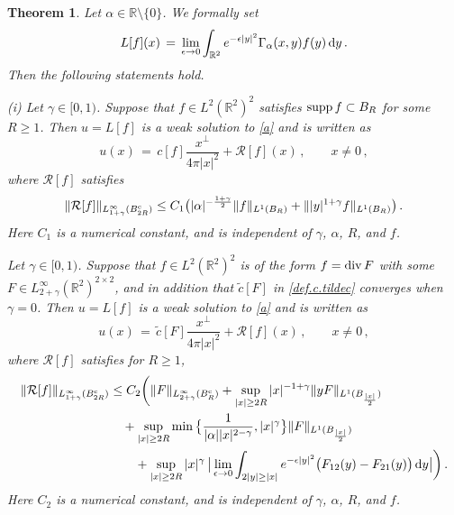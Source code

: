 \documentclass[11pt,a4paper]{article}
\newtheorem{theorem}{Theorem }[section]
\newcommand{\R}{\mathbb{R}}
\newcommand{\dd}{\,{\rm d}}
\begin{document}
\begin{theorem}\label{thm.linear.whole}
Let $\alpha \in \R \setminus \{0\}$. We formally set
%
\begin{equation}
L [f] (x) \, = \, \lim_{\epsilon\rightarrow 0} \int_{\R^2} e^{-\epsilon |y|^2}\Gamma_{\alpha}(x,y) f(y) \dd y\,.
\end{equation}
%
Then the following statements hold.

\noindent 
{\rm (i)} Let $\gamma \in [0,1)$. 
Suppose that $f\in L^2 (\R^2)^2$ satisfies ${\rm supp}\, f \subset B_{R}$ for some $R\ge1$. 
Then $u=L [f]$ is a weak solution to \eqref{a} and is written as 
%
\begin{equation}\label{est.thm.linear.whole.1}
u(x) \, =\,  c[f] \frac{x^{\bot}}{4\pi |x|^2} + \mathcal{R}[f] (x) \,, \qquad x\ne 0\,,
\end{equation}
%
where $\mathcal{R}[f]$ satisfies 
%
\begin{equation}\label{est.thm.linear.whole.2}
\begin{split}
\| \mathcal{R}[f] \|_{L^{\infty}_{1+\gamma} (B^{{\rm c}}_{2R})}
\le 
C_1 \big( 
|\alpha|^{-\frac{1+\gamma}{2}} \| f \|_{L^1 (B_{R})} 
+ \| |y|^{1+\gamma} f\|_{L^{1}(B_{R})} \big)\,.
\end{split}
\end{equation}
%
Here $C_1$ is a numerical constant, and is independent of  $\gamma$, $\alpha$, $R$, and $f$.

 Let $\gamma\in [0,1)$. 
Suppose that $f\in L^2 (\R^2)^2$ is of the form $f={\rm div}\,F$ 
with some $F\in L^\infty_{2+\gamma} (\R^2)^{2\times 2}$, and in addition that $\tilde c[F]$ in \eqref{def.c.tildec} converges when $\gamma=0$. Then $u=L [f]$ is a weak solution to \eqref{a} and is written as
%
\begin{equation}\label{est.thm.linear.whole.3}
u(x) \, = \, \tilde c[F] \frac{x^{\bot}}{4\pi |x|^2}  + \mathcal{R}[f] (x) \,, \quad \quad x\ne 0\,,
\end{equation}
\noindent
where  $\mathcal{R}[f]$ satisfies for $R\ge1$,
%
\begin{equation}\label{est.thm.linear.whole.4}
\begin{split}
\| \mathcal{R}[f] \|_{L^{\infty}_{1+\gamma} (B^{{\rm c}}_{2R})}
& \leq 
C_2  \bigg(  \| F \|_{L^{\infty}_{2+\gamma} (B^{{\rm c}}_{R})}
 + \sup_{|x|\geq 2R} |x|^{-1+\gamma} \| y F \|_{L^1 (B_{\frac{|x|}{2}})} \\
& \quad  + \sup_{|x|\geq 2 R} \min \big \{ \frac{1}{|\alpha| |x|^{2-\gamma}}, |x|^\gamma \big \} \| F \|_{L^1 (B_{\frac{|x|}{2}})} \\
& \qquad + \sup_{|x|\geq 2R} |x|^\gamma \, 
\big| \lim_{\epsilon\rightarrow 0} \int_{2|y|\geq |x|}  e^{-\epsilon |y|^2} \big(F_{12}(y) - F_{21}(y) \big) \dd y \big|   
\bigg)\,.
\end{split}
\end{equation}
%
Here $C_2$ is a numerical constant, and is independent of $\gamma$, $\alpha$, $R$, and $f$.
\end{theorem}
\end{document}
